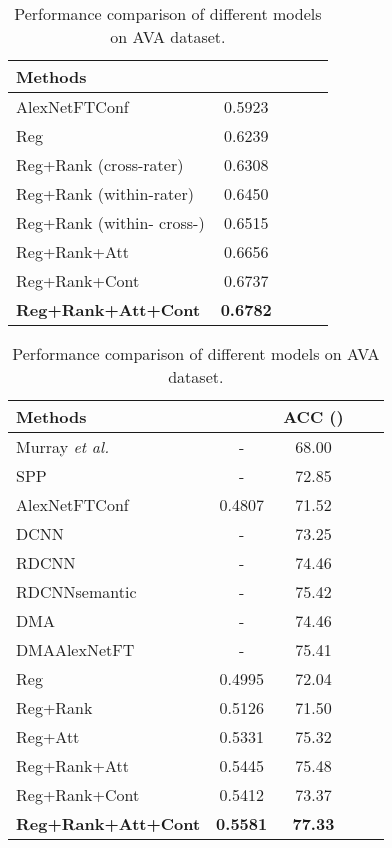 \documentclass[runningheads]{llncs}
\def\etal{{\em et al.\/}\,}
\begin{document}
\begin{table}[t]
\centering
\setlength\tabcolsep{4pt}
\begin{minipage}{0.48\textwidth}
\centering
\small
\centering
\caption{Performance comparison of different models on AADB dataset.}
\begin{tabular}{|l|c|c|c|c|}
\hline
Methods      &			 \\
\hline\hline
AlexNetFTConf  & 0.5923 \\
\hline
Reg              & 	0.6239 \\
Reg+Rank (cross-rater)        & 0.6308 \\
Reg+Rank (within-rater)       & 0.6450 \\
Reg+Rank (within-  cross-)& 0.6515 \\
Reg+Rank+Att    &	 0.6656  \\
Reg+Rank+Cont &	 0.6737  \\
\hline
\hline
\textbf{Reg+Rank+Att+Cont} &	 \textbf{0.6782}  \\
\hline
\end{tabular}
\label{tab:modelPerformanceAADB}
\end{minipage}\hfill
\begin{minipage}{0.48\textwidth}
\scriptsize
\centering
\caption{Performance comparison of different models on AVA dataset.}
\begin{tabular}{|l|c|c|c|c|}
\hline
Methods         &			&		ACC ()\\
\hline\hline
Murray \etal~\cite{murray2012ava} &	- & 68.00 \\
SPP~\cite{he2014spatial} & 	- & 72.85 \\
AlexNetFTConf	 & 0.4807 & 71.52\\
\hline
DCNN~\cite{lu2014rapid}  & 	- & 73.25 \\
RDCNN~\cite{lu2014rapid} & 	- & 74.46 \\
RDCNNsemantic~\cite{xin2015TMM}  & 	- & 75.42 \\
DMA~\cite{xin2015iccv}  & 	- & 74.46 \\
DMAAlexNetFT~\cite{xin2015iccv} & 	- & 75.41 \\
\hline
Reg              & 	0.4995 & 72.04  \\
Reg+Rank         & 0.5126 & 71.50 \\
Reg+Att          & 0.5331 & 75.32  \\
Reg+Rank+Att     & 0.5445 & 75.48  \\
Reg+Rank+Cont    & 0.5412& 73.37  \\
\hline
\hline
\textbf{Reg+Rank+Att+Cont} &  \textbf{0.5581} & \textbf{77.33}  \\
\hline
\end{tabular}
\label{tab:modelPerformanceAVA}
\end{minipage}
\vspace{-0.2in}
\end{table}
\end{document}
